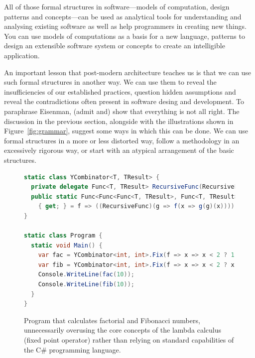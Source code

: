 All of those formal structures in software---models of computation, design patterns and
concepts---can be used as analytical tools for understanding and analysing existing software
as well as help programmers in creating new things. You can use models of computations as a
basis for a new language, patterns to design an extensible software system or concepts to
create an intelligible application.

An important lesson that post-modern architecture teaches us is that we can use such formal structures
in another way. We can use them to reveal the insufficiencies of our established practices, question
hidden assumptions and reveal the contradictions often present in software desing and development.
To paraphrase Eisenman, (admit and) show that everything is not all right. The
discussion in the previous section, alongside with the illustrations shown in Figure~\ref{fig:grammar},
suggest some ways in which this can be done. We can use formal structures in a more or less distorted way,
follow a methodology in an excessively rigorous way, or start with an atypical arrangement
of the basic structures.

\begin{figure}
\vspace{-1em}
\begin{lstlisting}[language=csharp]
static class YCombinator<T, TResult> {
  private delegate Func<T, TResult> RecursiveFunc(RecursiveFunc r);
  public static Func<Func<Func<T, TResult>, Func<T, TResult>>, Func<T, TResult>> Fix
    { get; } = f => ((RecursiveFunc)(g => f(x => g(g)(x))))(g => f(x => g(g)(x)));
}

static class Program {
  static void Main() {
    var fac = YCombinator<int, int>.Fix(f => x => x < 2 ? 1 : x * f(x - 1));
    var fib = YCombinator<int, int>.Fix(f => x => x < 2 ? x : f(x - 1) + f(x - 2));
    Console.WriteLine(fac(10));
    Console.WriteLine(fib(10));
  }
}
\end{lstlisting}
\vspace{-0.5em}
\caption{Program that calculates factorial and Fibonacci numbers, unnecessarily overusing
the core concepts of the lambda calculus (fixed point operator) rather than relying on
standard capabilities of the C\# programming language.}
\label{fig:ycombinator}
\vspace{-0.5em}
\end{figure}


